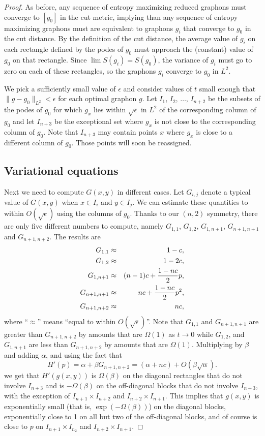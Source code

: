 \documentclass[12pt]{amsart}
\newcommand\be{\begin{equation}}
\newcommand\ee{\end{equation}}
\begin{document}
{\begin{proof}
As before, any sequence of entropy maximizing reduced graphons must converge to $[g_0]$ in the cut metric, implying 
than any sequence of entropy maximizing graphons must are equivalent to graphons $g_i$ that converge to $g_0$ in the cut distance. 
By the definition of the cut distance, the average value of $g_i$ on each rectangle defined by the podes of $g_0$ must 
approach the (constant) value of $g_0$ on that rectangle. Since $\lim S(g_i)=S(g_0)$, the variance of $g_i$ must go to zero on 
each of these rectangles, so the graphons $g_i$ converge to $g_0$ in $L^2$. 

We pick a sufficiently small value of $\epsilon$
and consider values of $t$ small enough that $\|g-g_0\|_{L^2} < \epsilon$ for each optimal graphon $g$.
Let $I_1$, $I_2$, $\ldots$, $I_{n+2}$ be the subsets of the podes of $g_0$ for which $g_x$ lies
within $\sqrt{\epsilon}$ in $L^2$ of the corresponding column of $g_0$ and let 
$I_{n+3}$ be the exceptional set where $g_x$ is not close to the corresponding column of $g_0$. 
Note that $I_{n+3}$ may contain points $x$ where
$g_x$ is close to a different column of $g_0$. Those points will soon be reassigned. 


\subsection{Variational equations} Next we need to compute $G(x,y)$ in different cases. Let 
$G_{i,j}$ denote a typical value of $G(x,y)$ when $x \in I_i$ and $y \in I_j$. 
We can estimate these quantities to within $O(\sqrt{\epsilon})$ using the 
columns of $g_0$.
Thanks to our 
$(n,2)$ symmetry, there are only five 
different numbers to compute, namely $G_{1,1}$, $G_{1,2}$, $G_{1,{n+1}}$, $G_{n+1,n+1}$ and 
$G_{n+1,n+2}$. The results are
\begin{eqnarray}
G_{1,1} & \approx & 1-c, \cr 
G_{1,2} & \approx & 1-2c, \cr 
G_{1,n+1} & \approx & (n-1)c + \frac{1-nc}{2} p, \cr 
G_{n+1,n+1} & \approx & nc + \frac{1-nc}{2} p^2, \cr 
G_{n+1,n+2} & \approx & nc,
\end{eqnarray}
where ``$\approx$'' means ``equal to within $O(\sqrt{\epsilon})$''. 
Note that $G_{1,1}$ and $G_{n+1, n+1}$ are greater than $G_{n+1, n+2}$ by amounts that are 
$\Omega(1)$ as $t \to 0$ while $G_{1,2}$, and $G_{1,n+1}$ are less than $G_{n+1,n+2}$ by amounts 
that are $\Omega(1)$. Multiplying by $\beta$ and adding $\alpha$, and using the fact that 
\be H'(p) = \alpha + \beta G_{n+1, n+2} = (\alpha + nc) + O(\beta \sqrt{\alpha}). \ee
we get that $H'(g(x,y))$ is $\Omega(\beta)$ on the diagonal rectangles that do not involve $I_{n+3}$
and is $-\Omega(\beta)$ on the off-diagonal blocks that do not involve $I_{n+3}$, with the exception
of $I_{n+1}\times I_{n+2}$ and $I_{n+2}\times I_{n+1}$. This implies that $g(x,y)$ is exponentially
small (that is, $\exp(-\Omega(\beta))$) on the diagonal blocks, exponentially close to 1 on all but two of the off-diagonal blocks, 
and of course is close to $p$ on $I_{n+1} \times I_{n_2}$ and $I_{n+2}\times I_{n+1}$. 



\end{proof}}
\end{document}
